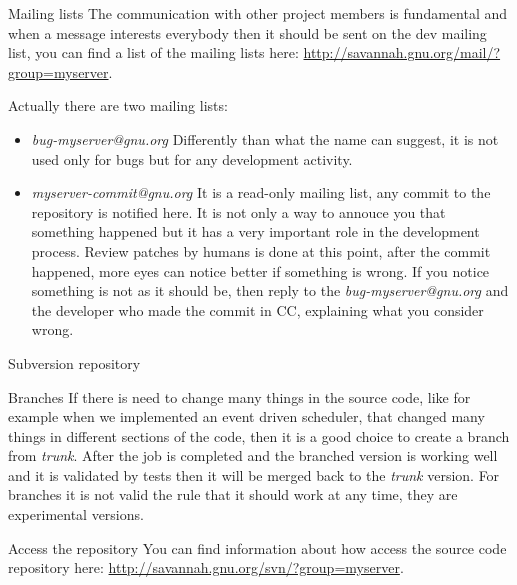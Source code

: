 \documentclass[12pt]{article}
\begin{document}
\begin{section}{Mailing lists}
The communication with other project members is fundamental and when a
message interests everybody then it should be sent on the dev mailing
list, you can find a list of the mailing lists here:
\url{http://savannah.gnu.org/mail/?group=myserver}.

Actually there are two mailing lists:
\begin{itemize}
\item \textit{bug-myserver@gnu.org} Differently than what the name can
  suggest, it is not used only for bugs but for any development
  activity.
\item \textit{myserver-commit@gnu.org} It is a read-only mailing list,
  any commit to the repository is notified here.  It is not only a way
  to annouce you that something happened but it has a very important
  role in the development process.  Review patches by humans is done
  at this point, after the commit happened, more eyes can notice
  better if something is wrong.  If you notice something is not as it
  should be, then reply to the \textit{bug-myserver@gnu.org} and the
  developer who made the commit in CC, explaining what you consider
  wrong.
\end{itemize}
\end{section}

\begin{section}{Subversion repository}\label{section:svn}
\begin{subsection}{Branches}
If there is need to change many things in the source code, like for
example when we implemented an event driven scheduler, that changed
many things in different sections of the code, then it is a good
choice to create a branch from \textit{trunk}.
After the job is completed and the branched version is working well
and it is validated by tests then it will be merged back to the
\textit{trunk} version.
For branches it is not valid the rule that it should work at any time,
they are experimental versions.
\end{subsection}

\begin{subsection}{Access the repository}
You can find information about how access the source code repository here:
\url{http://savannah.gnu.org/svn/?group=myserver}.
\end{subsection}
\end{section}
\end{document}
